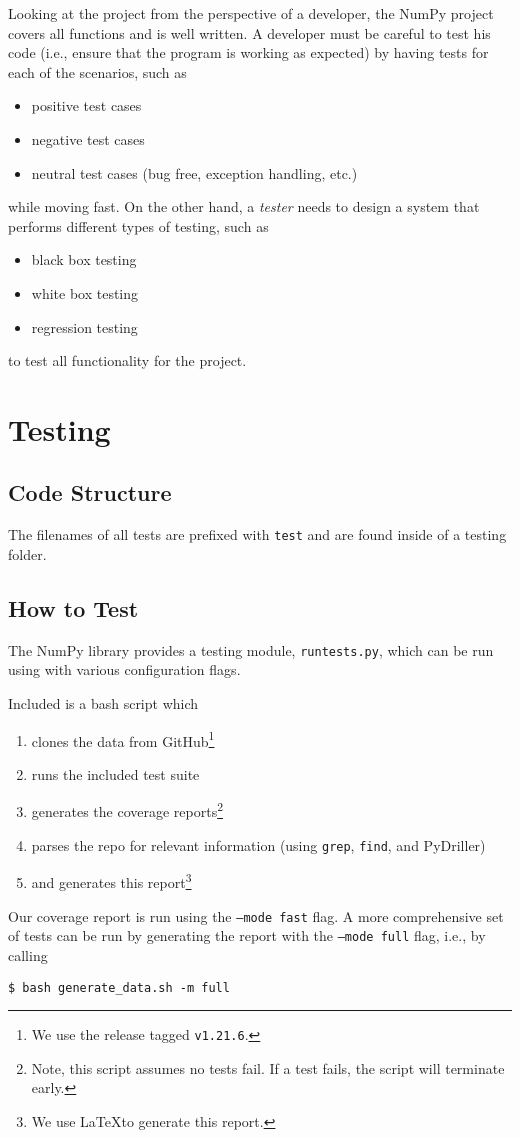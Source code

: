 \documentclass{article}
\begin{document}
Looking at the project from the perspective of a developer, the NumPy project covers all functions and is well written. A developer must be careful to test his code (i.e., ensure that the program is working as expected) by having tests for each of the scenarios, such as
\begin{itemize}
    \item positive test cases
    \item negative test cases
    \item neutral test cases (bug free, exception handling, etc.)
\end{itemize}
while moving fast. On the other hand, a \emph{tester} needs to design a system that performs different types of testing, such as
\begin{itemize}
    \item black box testing
    \item white box testing
    \item regression testing
\end{itemize}
to test all functionality for the project.
\section{Testing}
\subsection{Code Structure}
The filenames of all tests are prefixed with \texttt{test\textunderscore} and are found inside of a testing folder.
\subsection{How to Test}
The NumPy library provides a testing module, \texttt{runtests.py}, which can be run using with various configuration
flags\cite{testing}. 

Included is a bash script\cite{pat-project} which
\begin{enumerate}
    \item clones the data from GitHub\footnote{We use the release tagged \texttt{v1.21.6}.}
    \item runs the included test suite
    \item generates the coverage reports\footnote{Note, this script assumes no tests fail. If a test fails,
the script will terminate early.}
    \item parses the repo for relevant information (using \texttt{grep}\cite{grep}, \texttt{find}\cite{find}, and PyDriller\cite{PyDriller})
    \item and generates this report\footnote{We use \LaTeX to generate this report.}
\end{enumerate}
Our coverage report is run using the \texttt{--mode fast} flag. A more comprehensive set of tests
can be run by generating the report with the \texttt{--mode full} flag, i.e., by calling
\begin{verbatim}
$ bash generate_data.sh -m full
\end{verbatim}
\end{document}
